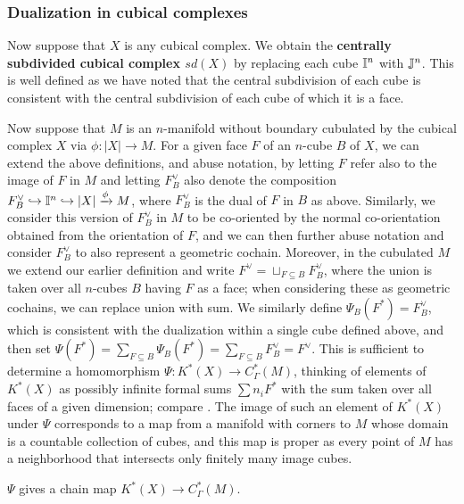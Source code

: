 \subsubsection{Dualization in cubical complexes}\label{S: dualization of complexes}

Now suppose that $X$ is any cubical complex.
We obtain the \textbf{centrally subdivided cubical complex $sd(X)$} by replacing each cube $\mathbb{I}^n$ with $\mathbb{J}^n$.
This is well defined as we have noted that the central subdivision of each cube is consistent with the central subdivision of each cube of which it is a face.

Now suppose that $M$ is an $n$-manifold without boundary cubulated by the cubical complex $X$ via $\phi \colon |X| \to M$.
For a given face $F$ of an $n$-cube $B$ of $X$, we can extend the above definitions, and abuse notation, by letting $F$ refer also to the image of $F$ in $M$ and letting $F_B^\vee$ also denote the composition $F_B^\vee \hookrightarrow \mathbb{I}^n \hookrightarrow |X| \xrightarrow{\phi} M$, where $F_B^\vee$ is the dual of $F$ in $B$ as above.
Similarly, we consider this version of $F_B^\vee$ in $M$ to be co-oriented by the normal co-orientation obtained from the orientation of $F$, and we can then further abuse notation and consider $F_B^\vee$ to also represent a geometric cochain.
Moreover, in the cubulated $M$ we extend our earlier definition and write $F^\vee = \sqcup_{F \subseteq B} F^\vee_B$, where the union is taken over all $n$-cubes $B$ having $F$ as a face; when considering these as geometric cochains, we can replace union with sum.
We similarly define $\Psi_B(F^*) = F_B^\vee$, which is consistent with the dualization within a single cube defined above, and then set $\Psi(F^*) = \sum_{F \subseteq B} \Psi_B(F^*) = \sum_{F \subseteq B} F_{B}^\vee = F^\vee$.
This is sufficient to determine a homomorphism $\Psi \colon K^*(X) \to C_\Gamma^*(M)$, thinking of elements of $K^*(X)$ as possibly infinite formal sums $\sum n_i F^*$ with the sum taken over all faces of a given dimension; compare \cite[Section 42]{Mun84}. The image of such an element of $K^*(X)$ under $\Psi$ corresponds to a map from a manifold with corners to $M$ whose domain is a countable collection of cubes, and this map is proper as every point of $M$ has a neighborhood that intersects only finitely many image cubes.

\begin{lemma}\label{L: dual chain map}
	$\Psi$ gives a chain map $K^*(X) \to C_\Gamma^*(M)$.
\end{lemma}

